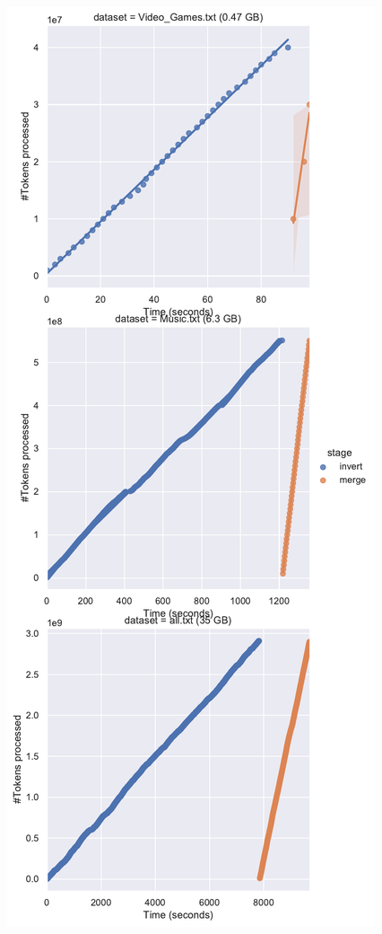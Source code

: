 \documentclass[11pt]{article}
\begin{document}
\begin{figure}
	\includegraphics[width=\textwidth,height=\textheight,keepaspectratio]{runtime.pdf}
\end{figure}
\end{document}
